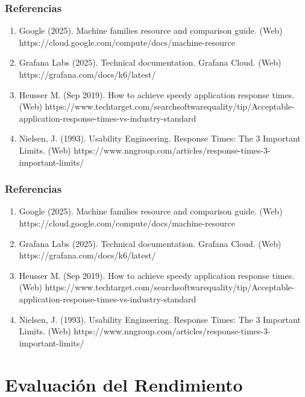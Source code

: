 \documentclass[
  paper=a4,
  ,captions=tableheading
]{scrartcl}
\providecommand{\tightlist}{%
  \setlength{\itemsep}{0pt}\setlength{\parskip}{0pt}}
\begin{document}
\subsubsection{Referencias}\label{sec:referencias}

\begin{enumerate}
\def\labelenumi{\arabic{enumi}.}
\tightlist
\item
  Google (2025). Machine families resource and comparison guide. (Web)
  https://cloud.google.com/compute/docs/machine-resource
\item
  Grafana Labs (2025). Technical documentation. Grafana Cloud. (Web)
  https://grafana.com/docs/k6/latest/
\item
  Heusser M. (Sep 2019). How to achieve speedy application response
  times. (Web)
  https://www.techtarget.com/searchsoftwarequality/tip/Acceptable-application-response-times-vs-industry-standard
\item
  Nielsen, J. (1993). Usability Engineering. Response Times: The 3
  Important Limits. (Web)
  https://www.nngroup.com/articles/response-times-3-important-limits/
\end{enumerate}

\subsubsection{Referencias}\label{sec:referencias-1}

\begin{enumerate}
\def\labelenumi{\arabic{enumi}.}
\tightlist
\item
  Google (2025). Machine families resource and comparison guide. (Web)
  https://cloud.google.com/compute/docs/machine-resource
\item
  Grafana Labs (2025). Technical documentation. Grafana Cloud. (Web)
  https://grafana.com/docs/k6/latest/
\item
  Heusser M. (Sep 2019). How to achieve speedy application response
  times. (Web)
  https://www.techtarget.com/searchsoftwarequality/tip/Acceptable-application-response-times-vs-industry-standard
\item
  Nielsen, J. (1993). Usability Engineering. Response Times: The 3
  Important Limits. (Web)
  https://www.nngroup.com/articles/response-times-3-important-limits/
\end{enumerate}

\newpage

\section{Evaluación del
Rendimiento}\label{sec:evaluaciuxf3n-del-rendimiento}
\end{document}
